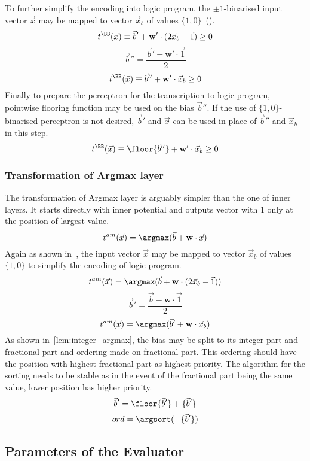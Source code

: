To further simplify the encoding into logic program, the $\pm 1$-binarised
input vector $\vec x$ may be mapped to vector $\vec x_b$
of values $\{1, 0\}$~().
\[t^\BB(\vec x) \equiv \vec b' + \mathbf{w}'\cdot (2\vec x_b - \vec 1) \geq 0\]
\[\vec b'' = \frac{\vec b' - \mathbf{w}'\cdot \vec 1}{2}\]
\[t^\BB(\vec x) \equiv \vec b'' + \mathbf{w}'\cdot \vec x_b \geq 0\]
Finally to prepare the perceptron for the transcription to logic program,
pointwise flooring function may be used on the bias $\vec b''$.
If the use of $\{1, 0\}$-binarised perceptron is not desired, $\vec b'$ and $\vec x$
can be used in place of $\vec b''$ and $\vec x_b$ in this step.
\[t^\BB(\vec x) \equiv \floor{\vec b''} + \mathbf{w}'\cdot \vec x_b \geq 0\]

\subsubsection{Transformation of Argmax layer}\label{sec:pyt_argmax}

The transformation of Argmax layer is arguably simpler than the one of
inner layers. It starts directly with inner potential and outputs vector
with 1 only at the position of largest value.
\[t^{am}(\vec x) = \argmax(\vec b + \mathbf{w}\cdot \vec x)\]
Again as shown in~, the input vector $\vec x$
may be mapped to vector $\vec x_b$ of values $\{1,0\}$ to simplify the encoding
of logic program.
\[t^{am}(\vec x) = \argmax(\vec b + \mathbf{w}\cdot (2\vec x_b - \vec 1))\]
\[\vec b' = \frac{\vec b - \mathbf{w}\cdot \vec 1}{2}\]
\[t^{am}(\vec x) = \argmax(\vec b' + \mathbf{w}\cdot \vec x_b)\]
As shown in~\cref{lem:integer_argmax}, the bias may be split to its integer part
and fractional part and ordering made on fractional part. This ordering should have
the position with highest fractional part as highest priority. The algorithm for the
sorting needs to be stable as in the event of the fractional part being the same value,
lower position has higher priority.
\[\vec b' = \floor{\vec b'} + \{\vec b'\}\]
\[ord = \argsort(-\{\vec b'\})\]

\subsection{Parameters of the Evaluator}\label{sec:python_pars}

